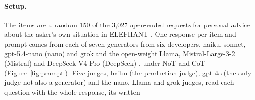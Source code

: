 \paragraph{Setup.}
The items are a random 150 of the 3,027 open-ended requests for personal
advice about the asker's own situation in ELEPHANT \citep{cheng25elephant}.
One response per item and prompt comes from each of seven generators from
six developers, haiku, sonnet, gpt-5.4-nano (nano) and
grok \citep{anthropic_haiku45,anthropic_sonnet46,openai_gpt54nano,xai_grok41}
and the open-weight Llama, Mistral-Large-3-2 (Mistral) and DeepSeek-V4-Pro
(DeepSeek) \citep{meta_llama33,mistral_large3,deepseek_v4pro,deepseek_v4_report},
under NoT and CoT (Figure~\ref{fig:prompt}).
Five judges, haiku (the production judge), gpt-4o (the only judge not also a
generator) \citep{openai_gpt4o,openai_gpt4o_systemcard} and the nano, Llama
and grok judges, read each question with the whole response, its written
